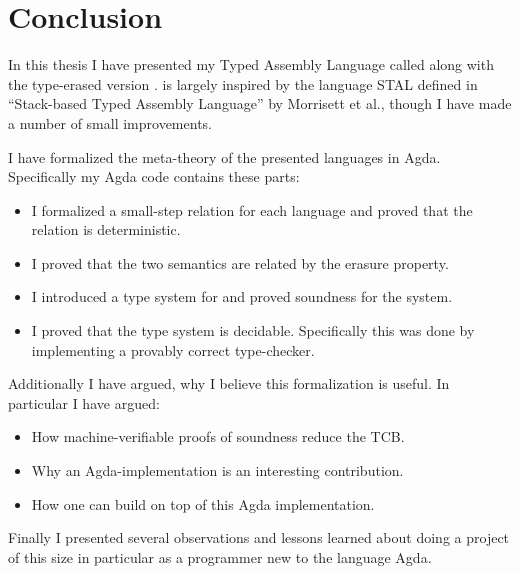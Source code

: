 \chapter{Conclusion}
\label{chap:conclusion}

In this thesis I have presented my Typed Assembly Language called \ATAL along
with the type-erased version \ATALe. \ATAL is largely inspired by the language
STAL defined in ``Stack-based Typed Assembly Language''\cite{STAL} by Morrisett
et al., though I have made a number of small improvements.

I have formalized the meta-theory of the presented languages in
Agda. Specifically my Agda code contains these parts:

\begin{itemize}
\item I formalized a small-step relation for each language and proved that the
  relation is deterministic.
\item I proved that the two semantics are related by the erasure property.
\item I introduced a type system for \ATAL and proved soundness for the system.
\item I proved that the type system is decidable. Specifically this was done by
  implementing a provably correct type-checker.
\end{itemize}

Additionally I have argued, why I believe this formalization is useful. In
particular I have argued:

\begin{itemize}
\item How machine-verifiable proofs of soundness reduce the TCB.
\item Why an Agda-implementation is an interesting contribution.
\item How one can build on top of this Agda implementation.
\end{itemize}

Finally I presented several observations and lessons learned about doing a
project of this size in particular as a programmer new to the language Agda.
